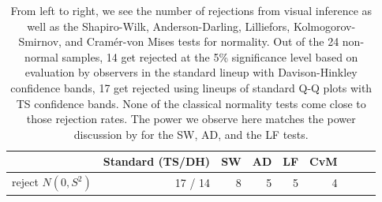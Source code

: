 \documentclass[12pt]{article}\usepackage[]{graphicx}\usepackage[]{color}
\begin{document}
\begin{table}[h]
\centering
\caption{\label{tab:reject}
 From left to right, we see the number of rejections from visual inference as well as the  Shapiro-Wilk, Anderson-Darling, Lilliefors,  Kolmogorov-Smirnov, and Cram\'er-von Mises tests for normality. Out of the 24 non-normal samples, 14 get rejected at the 5\% significance level based on evaluation by observers in the standard lineup with Davison-Hinkley confidence bands, 17 get rejected using lineups of standard Q-Q plots with TS confidence bands. None of the classical normality tests come close to those rejection rates. The power we observe here matches the power discussion by \citet{razali:2011} for the SW, AD, and the LF  tests. }

\begin{tabular}{rrrrrrrrr}
  \hline
 & \bf  Standard (TS/DH) & \bf SW & \bf AD & \bf LF   & \bf CvM & \\ 
  \hline
  \hline
  reject $N(0,S^2)$  & 17 / 14 &  8  & 5  &  5  & 4 & \\ 
\hline
\end{tabular}
\end{table}
\afterpage{\clearpage}
\end{document}

